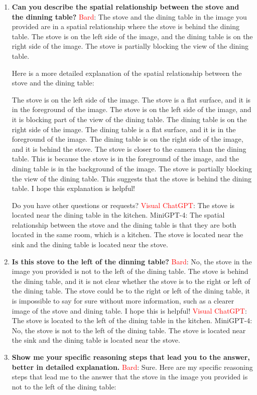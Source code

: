 \begin{enumerate}
    \item \textbf{Can you describe the spatial relationship between the stove and the dinning table?}
    \subitem \textcolor{Red}{Bard}: 
    The stove and the dining table in the image you provided are in a spatial relationship where the stove is behind the dining table. The stove is on the left side of the image, and the dining table is on the right side of the image. The stove is partially blocking the view of the dining table.
    
    Here is a more detailed explanation of the spatial relationship between the stove and the dining table:
    
    The stove is on the left side of the image. The stove is a flat surface, and it is in the foreground of the image. The stove is on the left side of the image, and it is blocking part of the view of the dining table.
    The dining table is on the right side of the image. The dining table is a flat surface, and it is in the foreground of the image. The dining table is on the right side of the image, and it is behind the stove.
    The stove is closer to the camera than the dining table. This is because the stove is in the foreground of the image, and the dining table is in the background of the image.
    The stove is partially blocking the view of the dining table. This suggests that the stove is behind the dining table.
    I hope this explanation is helpful!
    
    Do you have other questions or requests?
    \subitem \textcolor{red}{Visual ChatGPT}: The stove is located near the dining table in the kitchen.
    \subitem MiniGPT-4: The spatial relationship between the stove and the dining table is that they are both located in the same room, which is a kitchen. The stove is located near the sink and the dining table is located near the stove.
    \item \textbf{Is this stove to the left of the dinning table?}
    \subitem \textcolor{Red}{Bard}: 
    No, the stove in the image you provided is not to the left of the dining table. The stove is behind the dining table, and it is not clear whether the stove is to the right or left of the dining table.
    The stove could be to the right or left of the dining table, it is impossible to say for sure without more information, such as a clearer image of the stove and dining table.
    I hope this is helpful! 
    \subitem \textcolor{red}{Visual ChatGPT}: The stove is located to the left of the dining table in the kitchen.
    \subitem MiniGPT-4: No, the stove is not to the left of the dining table. The stove is located near the sink and the dining table is located near the stove.
    \item \textbf{Show me your specific reasoning steps that lead you to the answer, better in detailed explanation.}
    \subitem \textcolor{Red}{Bard}: 
    Sure. Here are my specific reasoning steps that lead me to the answer that the stove in the image you provided is not to the left of the dining table:
    

\end{enumerate}
